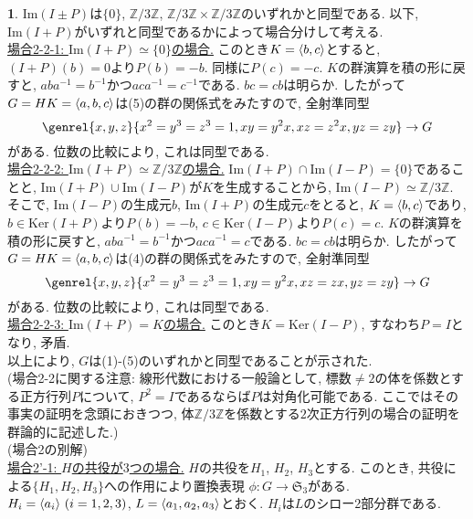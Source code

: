\documentclass{article}
\theoremstyle{definition}
\newtheorem{ans}{}
\numberwithin{ans}{subsection}
\newcommand{\Z}[1]{\mathbb{Z}/#1\mathbb{Z}}
\newcommand{\Ker}[1]{\mathrm{Ker}(#1)}
\DeclarePairedDelimiter{\gen}{\langle}{\rangle}
\begin{document}
\begin{ans}
  $\mathrm{Im}(I \pm P)$は$\{ 0 \}$, $\Z{3}$, $\Z{3} \times \Z{3}$のいずれかと同型である.
  以下, $\mathrm{Im}(I + P)$がいずれと同型であるかによって場合分けして考える.\\

  \underline{場合2-2-1: $\mathrm{Im}(I + P) \simeq \{ 0 \}$の場合.}
  このとき$K = \gen{b, c}$とすると, $(I + P)(b) = 0$より$P(b) = -b$.
  同様に$P(c) = -c$.
  $K$の群演算を積の形に戻すと, $aba^{-1} = b^{-1}$かつ$aca^{-1} = c^{-1}$である.
  $bc = cb$は明らか.
  したがって$G = HK = \gen{a, b, c}$は(5)の群の関係式をみたすので, 全射準同型
  \[
    \genrel{x, y, z}{x^2 = y^3 = z^3 = 1, xy = y^2x, xz = z^2x, yz = zy} \rightarrow G
  \]
  がある. 位数の比較により, これは同型である.\\

  \underline{場合2-2-2: $\mathrm{Im}(I + P) \simeq \Z{3}$の場合.}
  $\mathrm{Im}(I + P) \cap \mathrm{Im}(I - P) = \{ 0 \}$であることと,
  $\mathrm{Im}(I + P) \cup \mathrm{Im}(I - P)$が$K$を生成することから, $\mathrm{Im}(I - P) \simeq \Z{3}$.
  そこで, $\mathrm{Im}(I - P)$の生成元$b$, $\mathrm{Im}(I + P)$の生成元$c$をとると, $K = \gen{b, c}$であり,
  $b \in \Ker{I + P}$より$P(b) = -b$, $c \in \Ker{I - P}$より$P(c) = c$.
  $K$の群演算を積の形に戻すと, $aba^{-1} = b^{-1}$かつ$aca^{-1} = c$である.
  $bc = cb$は明らか.
  したがって$G = HK = \gen{a, b, c}$は(4)の群の関係式をみたすので, 全射準同型
  \[
    \genrel{x, y, z}{x^2 = y^3 = z^3 = 1, xy = y^2x, xz = zx, yz = zy} \rightarrow G
  \]
  がある. 位数の比較により, これは同型である.\\

  \underline{場合2-2-3: $\mathrm{Im}(I + P) = K$の場合.}
  このとき$K = \Ker{I - P}$, すなわち$P = I$となり, 矛盾.\\

  以上により, $G$は(1)-(5)のいずれかと同型であることが示された.\\

  (場合2-2に関する注意: 線形代数における一般論として, 標数$\neq 2$の体を係数とする正方行列$P$について,
  $P^2 = I$であるならば$P$は対角化可能である.
  ここではその事実の証明を念頭におきつつ, 体$\Z{3}$を係数とする$2$次正方行列の場合の証明を群論的に記述した.)\\

  (場合2の別解)\\

  \underline{場合2'-1: $H$の共役が$3$つの場合.}
  $H$の共役を$H_1$, $H_2$, $H_3$とする.
  このとき, 共役による$\{ H_1, H_2, H_3 \}$への作用により置換表現
  $\phi: G \rightarrow \mathfrak{S}_3$がある.
  $H_i = \gen{a_i}\ (i = 1, 2, 3)$, $L = \gen{a_1, a_2, a_3}$とおく.
  $H_i$は$L$のシロー2部分群である.


\end{ans}
\end{document}
